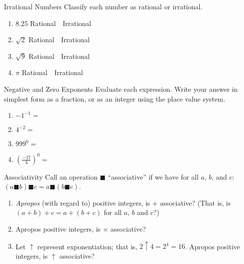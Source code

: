 \documentclass[12pt,a4paper]{report}
\begin{document}
\begin{problem}{Irrational Numbers}
 Classify each number as rational or irrational.

 \begin{enumerate}[\hspace{.5cm}a.]
  \item $8.25$ \hfill Rational~~Irrational
  \item $\sqrt{2}$ \hfill Rational~~Irrational
  \item $\sqrt{9}$ \hfill Rational~~Irrational
  \item $\pi$ \hfill Rational~~Irrational
 \end{enumerate}
\end{problem}

\begin{problem}{Negative and Zero Exponents}
 Evaluate each expression. Write your answer in simplest form as a fraction, or
 as an integer using the place value system.

 \begin{enumerate}[\hspace{.5cm}a.]
  \item ${-1}^{-1}=$ \hfill\blankC
  \item $4^{-2}=$ \hfill\blankC
  \item ${999}^0=$ \hfill\blankC
  \item ${\left(\frac{-17}{4}\right)}^0=$ \hfill\blankC
 \end{enumerate}
\end{problem}

\begin{problem}{Associativity}
 Call an operation $\blacksquare$ ``associative'' if we have for all $a$, $b$,
 and $c$: $(a \blacksquare b) \blacksquare c = a \blacksquare (b \blacksquare
 c)$.

 \begin{enumerate}[\hspace{.5cm}a.]
  \item \emph{Apropos} (with regard to) positive integers, is $+$ associative?
  (That is, is $(a+b)+c=a+(b+c)$ for all $a$, $b$ and $c$?)
  \item Apropos positive integers, is $\times$ associative?
  \item Let $\uparrow$ represent exponentiation; that is, $2\uparrow4=2^4=16$.
  Apropos positive integers, is $\uparrow$ associative?
 \end{enumerate}
\end{problem}
\end{document}
